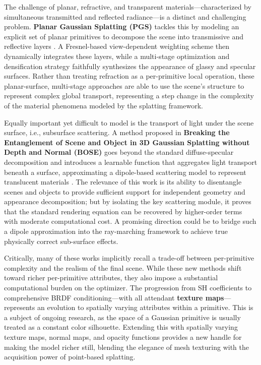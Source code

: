 \documentclass[11pt,a4paper]{article}
\begin{document}
The challenge of planar, refractive, and transparent materials---characterized by simultaneous transmitted and reflected radiance---is a distinct and challenging problem. \textbf{Planar Gaussian Splatting (PGS)} tackles this by modeling an explicit set of planar primitives to decompose the scene into transmissive and reflective layers \cite{arxiv:2601.17835v2}. A Fresnel-based view-dependent weighting scheme then dynamically integrates these layers, while a multi-stage optimization and densification strategy faithfully synthesizes the appearance of glassy and specular surfaces. Rather than treating refraction as a per-primitive local operation, these planar-surface, multi-stage approaches are able to use the scene's structure to represent complex global transport, representing a step change in the complexity of the material phenomena modeled by the splatting framework.

Equally important yet difficult to model is the transport of light under the scene surface, i.e., subsurface scattering. A method proposed in \textbf{Breaking the Entanglement of Scene and Object in 3D Gaussian Splatting without Depth and Normal (BOSE)} goes beyond the standard diffuse-specular decomposition and introduces a learnable function that aggregates light transport beneath a surface, approximating a dipole-based scattering model to represent translucent materials \cite{arxiv:2510.26694v1}. The relevance of this work is its ability to disentangle scenes and objects to provide sufficient support for independent geometry and appearance decomposition; but by isolating the key scattering module, it proves that the standard rendering equation can be recovered by higher-order terms with moderate computational cost. A promising direction could be to bridge such a dipole approximation into the ray-marching framework to achieve true physically correct sub-surface effects.

Critically, many of these works implicitly recall a trade-off between per-primitive complexity and the realism of the final scene. While these new methods shift toward richer per-primitive attributes, they also impose a substantial computational burden on the optimizer. The progression from SH coefficients to comprehensive BRDF conditioning---with all attendant \textbf{texture maps}---represents an evolution to spatially varying attributes within a primitive. This is a subject of ongoing research, as the space of a Gaussian primitive is usually treated as a constant color silhouette. Extending this with spatially varying texture maps, normal maps, and opacity functions provides a new handle for making the model richer still, blending the elegance of mesh texturing with the acquisition power of point-based splatting.
\end{document}
